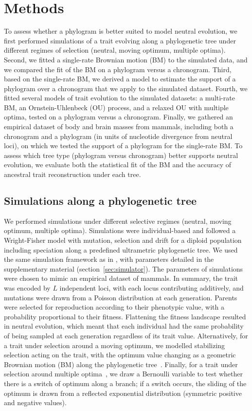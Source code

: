 \documentclass{article}
\newcommand{\NbrLoci}{L}
\begin{document}
\section*{Methods}
To assess whether a phylogram is better suited to model neutral evolution, we first performed simulations of a trait evolving along a phylogenetic tree under different regimes of selection (neutral, moving optimum, multiple optima).
Second, we fitted a single-rate Brownian motion (BM) to the simulated data, and we compared the fit of the BM on a phylogram versus a chronogram.
Third, based on the single-rate BM, we derived a model to estimate the support of a phylogram over a chronogram that we apply to the simulated dataset.
Fourth, we fitted several models of trait evolution to the simulated datasets: a multi-rate BM, an Ornstein-Uhlenbeck (OU) process, and a relaxed OU with multiple optima, tested on a phylogram versus a chronogram.
Finally, we gathered an empirical dataset of body and brain masses from mammals, including both a chronogram and a phylogram (in units of nucleotide divergence from neutral loci), on which we tested the support of a phylogram for the single-rate BM.
To assess which tree type (phylogram versus chronogram) better supports neutral evolution, we evaluate both the statistical fit of the BM and the accuracy of ancestral trait reconstruction under each tree.

\subsection*{Simulations along a phylogenetic tree}
We performed simulations under different selective regimes (neutral, moving optimum, multiple optima).
Simulations were individual-based and followed a Wright-Fisher model with mutation, selection and drift for a diploid population including speciation along a predefined ultrametric phylogenetic tree.
We used the same simulation framework as in \citet{latrille_detecting_2024}, with parameters detailed in the supplementary material (section~\ref{sec:simulator}).
The parameters of simulations were chosen to mimic an empirical dataset of mammals.
In summary, the trait was encoded by $\NbrLoci$ independent loci, with each locus contributing additively, and mutations were drawn from a Poisson distribution at each generation.
Parents were selected for reproduction according to their phenotypic value, with a probability proportional to their fitness.
Flattening the fitness landscape resulted in neutral evolution, which meant that each individual had the same probability of being sampled at each generation regardless of its trait value.
Alternatively, for a trait under selection around a moving optimum, we modelled stabilizing selection acting on the trait, with the optimum value changing as a geometric Brownian motion (BM) along the phylogenetic tree~\citep{hansen_stabilizing_1997, hansen_translating_1996}.
Finally, for a trait under selection around multiple optima~\citep{uyeda_novel_2014}, we draw a Bernoulli variable to test whether there is a switch of optimum along a branch; if a switch occurs, the sliding of the optimum is drawn from a reflected exponential distribution (symmetric positive and negative values).
\end{document}
